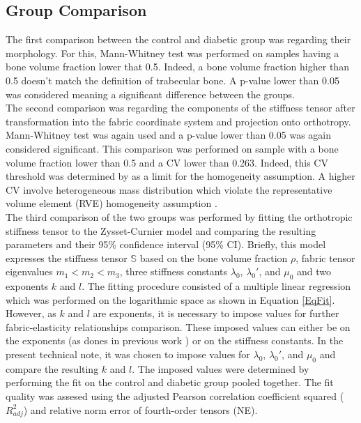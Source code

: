 \documentclass[a4paper,fleqn]{DC_ArtStyle}
\begin{document}
	\subsection{Group Comparison}
	The first comparison between the control and diabetic group was regarding their morphology.
	For this, Mann-Whitney test was performed on samples having a bone volume fraction lower that 0.5.
	Indeed, a bone volume fraction higher than 0.5 doesn't match the definition of trabecular bone.
	A p-value lower than 0.05 was considered meaning a significant difference between the groups.
	\\[0.5em]
	The second comparison was regarding the components of the stiffness tensor after transformation into the fabric coordinate system and projection onto orthotropy.
	Mann-Whitney test was again used and a p-value lower than 0.05 was again considered significant.
	This comparison was performed on sample with a bone volume fraction lower than 0.5 and a CV lower than 0.263.
	Indeed, this CV threshold was determined by \citeauthor{Panyasantisuk2015} \cite{Panyasantisuk2015} as a limit for the homogeneity assumption.
	A higher CV involve heterogeneous mass distribution which violate the representative volume element (RVE) homogeneity assumption \cite{Cowin2007}.
	\\[0.5em]
	The third comparison of the two groups was performed by fitting the orthotropic stiffness tensor to the Zysset-Curnier model \cite{Zysset1995} and comparing the resulting parameters and their 95\% confidence interval (95\% CI).
	Briefly, this model expresses the stiffness tensor $\mathbb{S}$ based on the bone volume fraction $\rho$, fabric tensor eigenvalues $m_1 < m_2 < m_3$, three stiffness constants $\lambda_0$, $\lambda_0'$, and $\mu_0$ and two exponents $k$ and $l$.
	The fitting procedure consisted of a multiple linear regression which was performed on the logarithmic space as shown in Equation \ref{EqFit}.
	However, as $k$ and $l$ are exponents, it is necessary to impose values for further fabric-elasticity relationships comparison.
	These imposed values can either be on the exponents (as dones in previous work \cite{Simon2022}) or on the stiffness constants.
	In the present technical note, it was chosen to impose values for $\lambda_0$, $\lambda_0'$, and $\mu_0$ and compare the resulting $k$ and $l$.
	The imposed values were determined by performing the fit on the control and diabetic group pooled together.
	The fit quality was assesed using the adjusted Pearson correlation coefficient squared ($R_{adj}^{2}$) and relative norm error of fourth-order tensors (NE).
\end{document}
